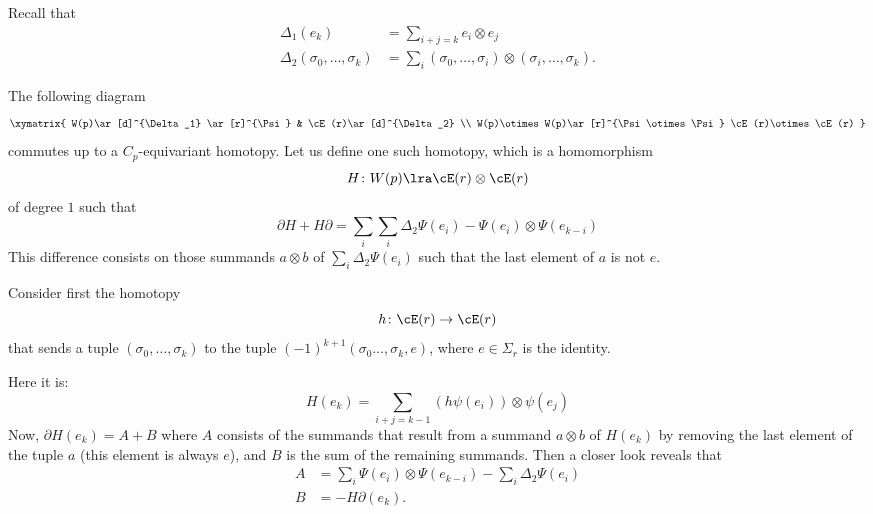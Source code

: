 Recall that
\begin{align*}
\Delta_1(e_k) &= \sum_{i+j=k} e_i\otimes e_j \\
\Delta_2(\sigma_0,\ldots,\sigma_k) &= \sum_{i} (\sigma_0,\ldots,\sigma_i)\otimes (\sigma_i,\ldots,\sigma_k).
\end{align*}

The following diagram
\[\xymatrix{
W(p)\ar[d]^{\Delta_1} \ar[r]^{\Psi} & \cE(r)\ar[d]^{\Delta_2} \\
W(p)\otimes W(p)\ar[r]^{\Psi\otimes\Psi} \cE(r)\otimes \cE(r)
}
\]
commutes up to a $C_p$-equivariant homotopy. Let us define one such homotopy, which is a homomorphism
\[H\colon W(p)\lra \cE(r)\otimes \cE(r)\]
of degree $1$ such that 
\[\partial H + H\partial = \sum_{i} \sum_{i} \Delta_2\Psi(e_i)-\Psi(e_i)\otimes \Psi(e_{k-i})
\]
This difference consists on those summands $a\otimes b$ of $\sum_i\Delta_2\Psi(e_i)$ such that the last element of $a$ is not $e$.


Consider first the homotopy
\[h\colon \cE(r)\to \cE(r)\]
that sends a tuple $(\sigma_0,\ldots,\sigma_k)$ to the tuple $(-1)^{k+1}(\sigma_0\ldots,\sigma_k,e)$, where $e\in \Sigma_r$ is the identity.


Here it is:
\[H(e_k) = \sum_{i+j=k-1} (h\psi(e_i))\otimes \psi(e_j)\]
Now, $\partial H(e_k) = A + B$ where $A$ consists of the summands that result from a summand $a\otimes b$ of $H(e_k)$ by removing the last element of the tuple $a$ (this element is always $e$), and $B$ is the sum of the remaining summands. Then a closer look reveals that 
\begin{align*}
A &=  \sum_{i} \Psi(e_i)\otimes \Psi(e_{k-i}) - \sum_{i} \Delta_2\Psi(e_i) \\
B &= -H\partial(e_k). %
\end{align*}
